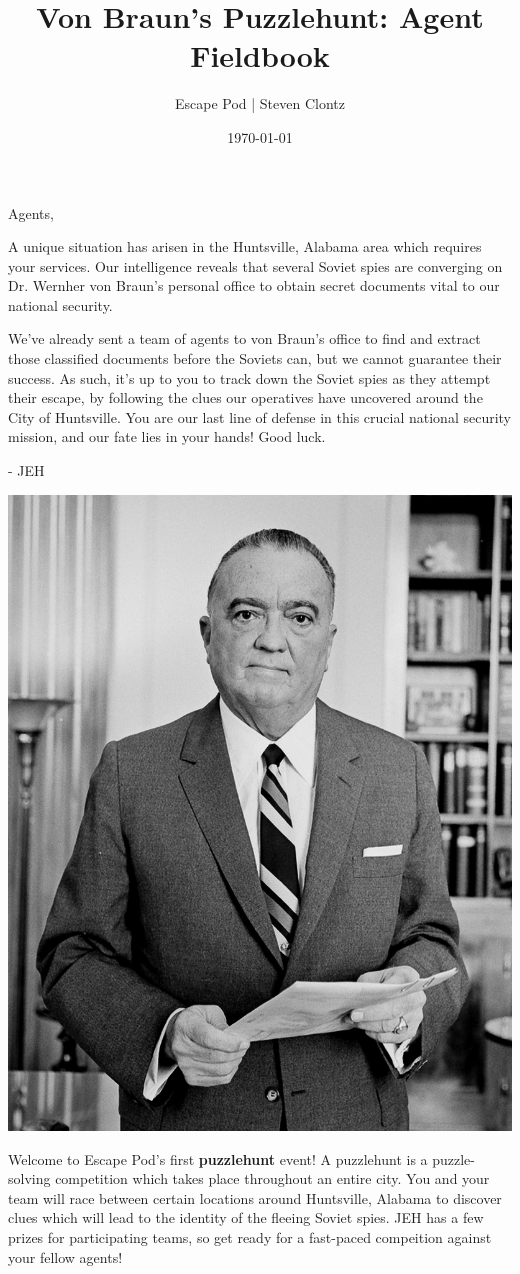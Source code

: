 \documentclass{puzzlehunt}
\title{Von Braun's Puzzlehunt: Agent Fieldbook}
\author{Escape Pod | Steven Clontz}
\date{\today}
\begin{document}
\frontmatter %

\phTitlePage %


\mainmatter %




\noindent Agents,

A unique situation has arisen in the Huntsville, Alabama area which requires
your services. Our intelligence reveals that several Soviet spies are converging
on Dr. Wernher von Braun's personal office to obtain secret documents vital to
our national security.

We've already sent a team of agents to von Braun's office to find and extract
those classified documents before the Soviets can, but we cannot guarantee
their success. As such, it's up to you to track down the Soviet spies as they
attempt their escape, by following the clues our operatives have uncovered
around the City of Huntsville. You are our last line of defense in this crucial
national security mission, and our fate lies in your hands! Good luck.

- JEH

\begin{center}
  \includegraphics[width=.5\linewidth]{jeh.jpg}
\end{center}


Welcome to Escape Pod's first \textbf{puzzlehunt} event! A puzzlehunt
is a puzzle-solving competition which takes place throughout an entire city.
You and your team will race between certain locations around Huntsville,
Alabama to discover clues
which will lead to the identity of the fleeing Soviet spies. JEH has a
few prizes for participating teams, so get ready for a fast-paced compeition
against your fellow agents!
\end{document}
